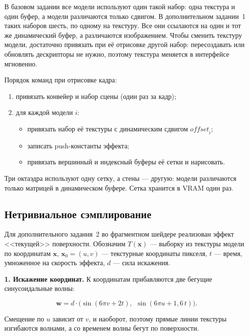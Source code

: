 \documentclass[14pt,a4paper]{extarticle}
\begin{document}
В базовом задании все модели используют один такой набор: одна текстура и
один буфер, а модели различаются только сдвигом. В дополнительном
задании~1 таких наборов шесть, по одному на текстуру. Все они ссылаются на
один и тот же динамический буфер, а различаются изображением. Чтобы сменить
текстуру модели, достаточно привязать при её отрисовке другой набор:
пересоздавать или обновлять дескрипторы не нужно, поэтому текстура меняется
в интерфейсе мгновенно.

Порядок команд при отрисовке кадра:

\begin{enumerate}[nosep, leftmargin=*]
	\item привязать конвейер и набор сцены (один раз за кадр);
	\item для каждой модели $i$:
	\begin{itemize}[nosep]
		\item привязать набор её текстуры с динамическим сдвигом
		$\mathit{offset}_i$;
		\item записать push-константы эффекта;
		\item привязать вершинный и индексный буферы её сетки и нарисовать.
	\end{itemize}
\end{enumerate}

Три октаэдра используют одну сетку, а стены — другую: модели различаются
только матрицей в динамическом буфере. Сетка хранится в VRAM один раз.

\subsection{Нетривиальное сэмплирование}

Для дополнительного задания~2 во фрагментном шейдере реализован эффект
<<текущей>> поверхности. Обозначим $T(\mathbf{x})$ — выборку из текстуры
модели по координатам $\mathbf{x}$, $\mathbf{x}_0 = (u, v)$ — текстурные
координаты пикселя, $t$ — время, умноженное на скорость эффекта, $d$ — сила
искажения.

\textbf{1. Искажение координат.} К координатам прибавляются две бегущие
синусоидальные волны:

\begin{equation}
	\mathbf{w} = d \cdot \bigl(\sin(6\pi v + 2t),\ \ \sin(6\pi u + 1{,}6\,t)\bigr).
\end{equation}

Смещение по $u$ зависит от $v$, и наоборот, поэтому прямые линии текстуры
изгибаются волнами, а со временем волны бегут по поверхности.
\end{document}
